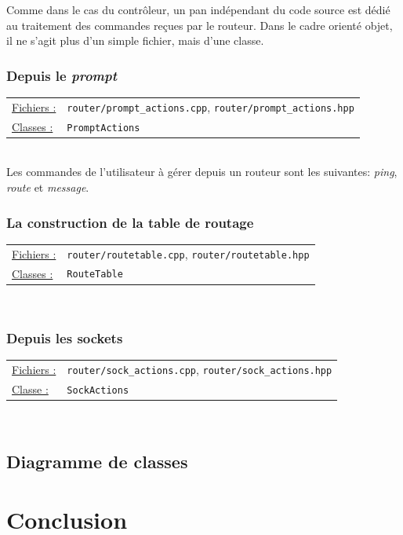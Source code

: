 \documentclass[a4paper,11pt]{article}
\begin{document}
Comme dans le cas du contrôleur, un pan indépendant du code source est dédié au traitement des commandes reçues par le routeur. Dans le cadre orienté objet, il ne s'agit plus d'un simple fichier, mais d'une classe.

\subsubsection{Depuis le \textit{prompt}} %

\begin{tabularx}{\linewidth}{lX}
\underline{Fichiers :} & \texttt{router/prompt\_actions.cpp}, \texttt{router/prompt\_actions.hpp}\\
\underline{Classes :} & \texttt{PromptActions}\\
\end{tabularx}\\

Les commandes de l'utilisateur à gérer depuis un routeur sont les suivantes: \textit{ping}, \textit{route} et \textit{message}.

\subsubsection*{La construction de la table de routage} %

\begin{tabularx}{\linewidth}{lX}
\underline{Fichiers :} & \texttt{router/routetable.cpp}, \texttt{router/routetable.hpp}\\
\underline{Classes :} & \texttt{RouteTable}\\
\end{tabularx}\\

\subsubsection{Depuis les sockets} %

\begin{tabularx}{\linewidth}{lX}
\underline{Fichiers :} & \texttt{router/sock\_actions.cpp}, \texttt{router/sock\_actions.hpp}\\
\underline{Classe :} & \texttt{SockActions}\\
\end{tabularx}\\

\subsection{Diagramme de classes} %

\section*{Conclusion} %

\end{document}
